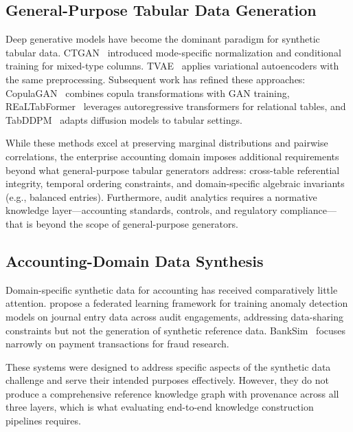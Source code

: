 \subsection{General-Purpose Tabular Data Generation}
\label{sec:rw_tabular}

Deep generative models have become the dominant paradigm for synthetic
tabular data.  CTGAN~\citep{xu2019modeling} introduced mode-specific
normalization and conditional training for mixed-type columns.
TVAE~\citep{xu2019modeling} applies variational autoencoders with the
same preprocessing.  Subsequent work has refined these approaches:
CopulaGAN~\citep{patki2016synthetic} combines copula transformations
with GAN training, REaLTabFormer~\citep{solatorio2023realtabformer}
leverages autoregressive transformers for relational tables, and
TabDDPM~\citep{kotelnikov2023tabddpm} adapts diffusion models to
tabular settings.

While these methods excel at preserving marginal distributions and
pairwise correlations, the enterprise accounting domain imposes additional requirements
beyond what general-purpose tabular generators address: cross-table
referential integrity, temporal ordering constraints, and
domain-specific algebraic invariants (e.g., balanced entries).
Furthermore, audit analytics requires a normative knowledge
layer---accounting standards, controls, and regulatory compliance---that
is beyond the scope of general-purpose generators.

\subsection{Accounting-Domain Data Synthesis}
\label{sec:rw_accounting}

Domain-specific synthetic data for accounting has received comparatively
little attention.  \citet{schreyer2022federated} propose a federated
learning framework for training anomaly detection models on journal
entry data across audit engagements, addressing data-sharing constraints
but not the generation of synthetic reference data.
BankSim~\citep{lopez2014banksim} focuses narrowly on payment
transactions for fraud research.

These systems were designed to address specific aspects of the
synthetic data challenge and serve their intended purposes
effectively.  However, they do not produce a comprehensive reference
knowledge graph with provenance across all three layers, which is what
evaluating end-to-end knowledge construction pipelines requires.

